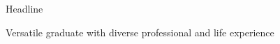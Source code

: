 \documentclass{resume} %
\begin{document}

\begin{rSection}{Headline}

Versatile graduate with diverse professional and life experience \\

\end{rSection}









\end{document}
